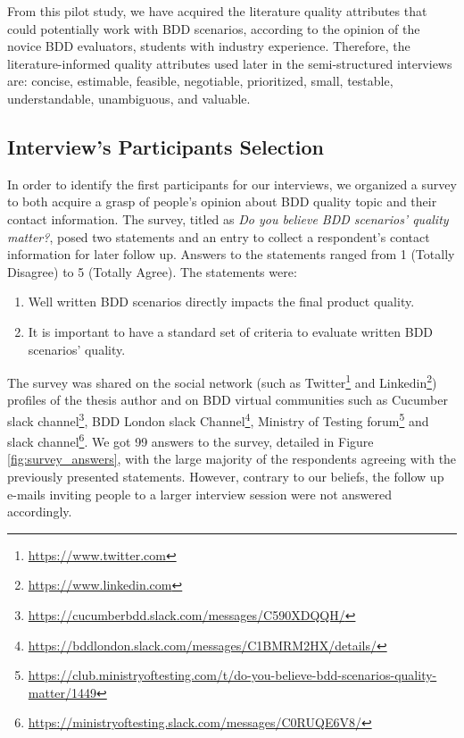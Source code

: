 From this pilot study, we have acquired the literature quality attributes that could potentially work with BDD scenarios, according to the opinion of the novice BDD evaluators, students with industry experience. Therefore, the literature-informed quality attributes used later in the semi-structured interviews are: concise, estimable, feasible, negotiable, prioritized, small, testable, understandable, unambiguous, and valuable. 

\subsection{Interview's Participants Selection}

In order to identify the first participants for our interviews, we organized a survey to both acquire a grasp of people's opinion about BDD quality topic and their contact information. The survey, titled as \textit{Do you believe BDD scenarios' quality matter?}, posed two statements and an entry to collect a respondent's contact information for later follow up. Answers to the statements ranged from 1 (Totally Disagree) to 5 (Totally Agree). The statements were:

\begin{enumerate}
    \item Well written BDD scenarios directly impacts the final product quality.
    \item It is important to have a standard set of criteria to evaluate written BDD scenarios' quality.
\end{enumerate}

The survey was shared on the social network (such as Twitter\footnote{\url{https://www.twitter.com}} and Linkedin\footnote{\url{https://www.linkedin.com}}) profiles of the thesis author and on BDD virtual communities such as Cucumber slack channel\footnote{\url{https://cucumberbdd.slack.com/messages/C590XDQQH/}}, BDD London slack Channel\footnote{\url{https://bddlondon.slack.com/messages/C1BMRM2HX/details/}}, Ministry of Testing forum\footnote{\url{https://club.ministryoftesting.com/t/do-you-believe-bdd-scenarios-quality-matter/1449}} and slack channel\footnote{\url{https://ministryoftesting.slack.com/messages/C0RUQE6V8/}}. 
We got 99 answers to the survey, detailed in Figure \ref{fig:survey_answers}, with the large majority of the respondents agreeing with the previously presented statements. However, contrary to our beliefs, the follow up e-mails inviting people to a larger interview session were not answered accordingly.  

